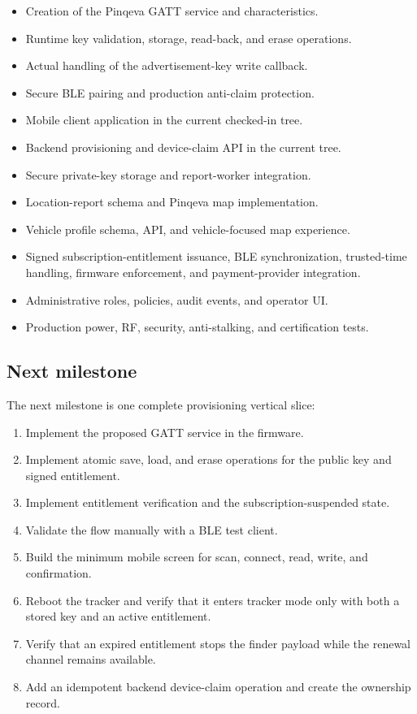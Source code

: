 \documentclass[12pt,a4paper]{article}
\begin{document}
\begin{itemize}
    \item Creation of the Pinqeva GATT service and characteristics.
    \item Runtime key validation, storage, read-back, and erase operations.
    \item Actual handling of the advertisement-key write callback.
    \item Secure BLE pairing and production anti-claim protection.
    \item Mobile client application in the current checked-in tree.
    \item Backend provisioning and device-claim API in the current tree.
    \item Secure private-key storage and report-worker integration.
    \item Location-report schema and Pinqeva map implementation.
    \item Vehicle profile schema, API, and vehicle-focused map experience.
    \item Signed subscription-entitlement issuance, BLE synchronization,
    trusted-time handling, firmware enforcement, and payment-provider
    integration.
    \item Administrative roles, policies, audit events, and operator UI.
    \item Production power, RF, security, anti-stalking, and certification tests.
\end{itemize}

\subsection{Next milestone}

The next milestone is one complete provisioning vertical slice:

\begin{enumerate}
    \item Implement the proposed GATT service in the firmware.
    \item Implement atomic save, load, and erase operations for the public key
    and signed entitlement.
    \item Implement entitlement verification and the subscription-suspended
    state.
    \item Validate the flow manually with a BLE test client.
    \item Build the minimum mobile screen for scan, connect, read, write, and
    confirmation.
    \item Reboot the tracker and verify that it enters tracker mode only with
    both a stored key and an active entitlement.
    \item Verify that an expired entitlement stops the finder payload while the
    renewal channel remains available.
    \item Add an idempotent backend device-claim operation and create the
    ownership record.
\end{enumerate}
\end{document}
